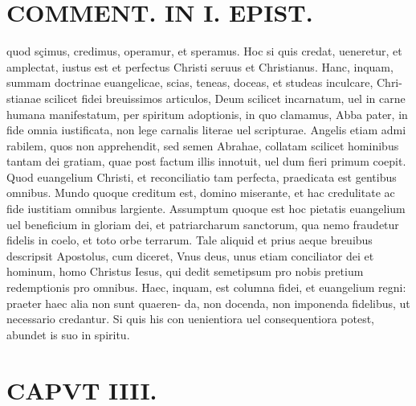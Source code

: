 \documentclass{article}
\begin{document}
\begin{pages}
\section*{COMMENT. IN I. EPIST. }
\marginpar{[ p.504 ]}\pstart quod sçimus, credimus, operamur, et speramus. Hoc si quis credat, ueneretur, et amplectat, iustus est et perfectus Christi seruus et Christianus. Hanc, inquam, summam doctrinae euangelicae, scias, teneas, doceas, et studeas inculcare, Chri- stianae scilicet fidei breuissimos articulos, Deum scilicet incarnatum, uel in carne humana manifestatum, per spiritum adoptionis, in quo clamamus, Abba pater, in fide omnia iustificata, non lege carnalis literae uel scripturae. Angelis etiam admi rabilem, quos non apprehendit, sed semen Abrahae, collatam scilicet hominibus tantam dei gratiam, quae post factum illis innotuit, uel dum fieri primum coepit. Quod euangelium Christi, et reconciliatio tam perfecta, praedicata est gentibus omnibus. Mundo quoque creditum est, domino miserante, et hac credulitate ac fide iustitiam omnibus largiente. Assumptum quoque est hoc pietatis euangelium uel beneficium in gloriam dei, et patriarcharum sanctorum, qua nemo fraudetur fidelis in coelo, et toto orbe terrarum. Tale aliquid et prius aeque breuibus descripsit Apostolus, cum diceret, Vnus deus, unus etiam conciliator dei et hominum, homo Christus Iesus, qui dedit semetipsum pro nobis pretium redemptionis pro omnibus. Haec, inquam, est columna fidei, et euangelium regni: praeter haec alia non sunt quaeren- da, non docenda, non imponenda fidelibus, ut necessario credantur. Si quis his con uenientiora uel consequentiora potest, abundet is suo in spiritu.  \pend
\endnumbering\beginnumbering\section{CAPVT IIII.}
{}

\end{pages}
\end{document}
